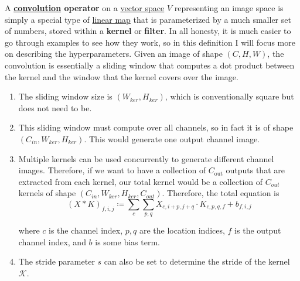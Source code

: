   \begin{definition}
    \label{def:convolutional-kernel}
    A \textbf{\hyperref[prob-def:convolution]{convolution} operator} on a \hyperref[lin-def:vector-space]{vector space} $V$ representing an image space is simply a special type of \hyperref[lin-def:linear_map]{linear map} that is parameterized by a much smaller set of numbers, stored within a \textbf{kernel} or \textbf{filter}. In all honesty, it is much easier to go through examples to see how they work, so in this definition I will focus more on describing the hyperparameters. Given an image of shape $(C, H, W)$, the convolution is essentially a sliding window that computes a dot product between the kernel and the window that the kernel covers over the image. 
    \begin{enumerate}
      \item The sliding window size is $(W_{ker}, H_{ker})$, which is conventionally square but does not need to be. 

      \item This sliding window must compute over all channels, so in fact it is of shape $(C_{in}, W_{ker}, H_{ker})$. This would generate one output channel image. 

      \item Multiple kernels can be used concurrently to generate different channel images. Therefore, if we want to have a collection of $C_{\text{out}}$ outputs that are extracted from each kernel, our total kernel would be a collection of $C_{out}$ kernels of shape $(C_{in}, W_{ker}, H_{ker}, C_{out})$. Therefore, the total equation is 
      \begin{equation}
        (X \ast K)_{f, i, j} \coloneqq \sum_c \sum_{p, q} X_{c, i + p, j + q} \cdot K_{c, p, q, f} + b_{f, i, j}
      \end{equation}

      where $c$ is the channel index, $p, q$ are the location indices, $f$ is the output channel index, and $b$ is some bias term. 

      \item The stride parameter $s$ can also be set to determine the stride of the kernel $\mathcal{K}$. 


\end{enumerate}
\end{definition}
